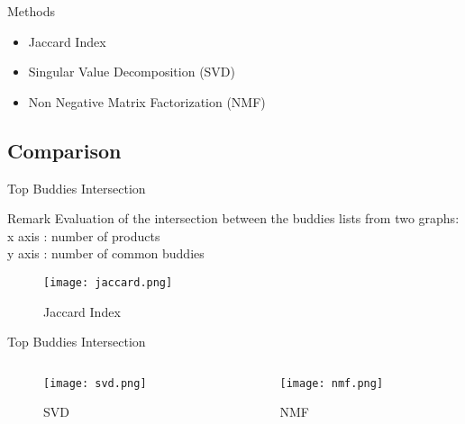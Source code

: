 \documentclass[pdf]{beamer}
\begin{document}
\begin{frame}{Methods}
\begin{itemize}
\item{Jaccard Index}
\item{Singular Value Decomposition (SVD)}
\item{Non Negative Matrix Factorization (NMF)}
\end{itemize}
\end{frame}

\subsection{Comparison}


\begin{frame}{Top Buddies Intersection}
\begin{block}{Remark}
Evaluation of the intersection between the buddies lists from two graphs: \\
x axis : number of products \\
y axis : number of common buddies 
\end{block}
\begin{figure}
\texttt{[image: jaccard.png]}
\caption{Jaccard Index}
\end{figure}
\end{frame}

\begin{frame}{Top Buddies Intersection}
     \begin{columns}[T] %
     \begin{column}[T]{5cm} %
              \begin{figure}
     \texttt{[image: svd.png]}
     \caption{SVD}
              \end{figure}
     \end{column}
          \begin{column}[T]{5cm} %
          \begin{figure}
     \texttt{[image: nmf.png]}
          \caption{NMF}
              \end{figure}
    	\end{column}
     \end{columns}
\end{frame}
\end{document}
